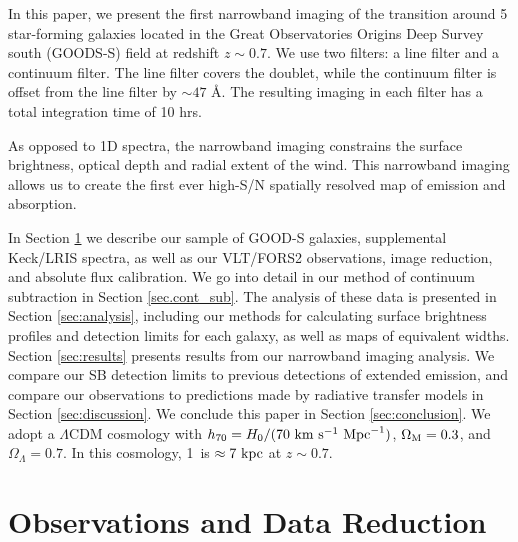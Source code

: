 \documentclass[twocolumn]{aastex61}
\begin{document}
In this paper, we present the first narrowband imaging of the  transition around 5 star-forming  galaxies located in the Great Observatories Origins Deep Survey south (GOODS-S) field at redshift $z \sim 0.7$. 
We use two filters: a line filter and a continuum filter. The line filter covers the  doublet, while the continuum filter is offset from the line filter by ${\sim}47$ \AA.    
The resulting imaging in each filter has a total integration time of 10 hrs.

As opposed to 1D spectra, the narrowband imaging constrains the surface brightness, optical depth and radial extent of the wind. This narrowband imaging allows us to create the first ever high-S/N spatially resolved map of  emission and absorption. 

In Section \ref{sec:obs_red} we describe our sample of GOOD-S galaxies, supplemental Keck/LRIS spectra, as well as our VLT/FORS2 observations, image reduction, and absolute flux calibration. We go into detail in our method of continuum subtraction in Section \ref{sec.cont_sub}. The analysis of these data is presented in Section \ref{sec:analysis}, 
including our methods for calculating surface brightness profiles and detection limits for each galaxy, as well as maps of  equivalent widths.
Section \ref{sec:results} presents results from our narrowband imaging analysis. We compare our SB detection limits to previous detections of extended  emission,  and compare our observations to predictions made by radiative transfer models in Section \ref{sec:discussion}. We conclude this paper in Section \ref{sec:conclusion}.
We adopt a $\Lambda$CDM cosmology with $h_{70} = H_0/(70\ \rm{ km}\ \rm{ s}^{-1}\ \rm{ Mpc}^{-1})$, $\Omega_{\rm{M}}= 0.3$, and $\Omega_{\Lambda} = 0.7$. In this cosmology, 1\arcsec\  is $\approx 7\ \rm kpc$ at $z \sim 0.7$.


\section{Observations and Data Reduction}\label{sec:obs_red}
\end{document}
